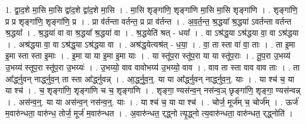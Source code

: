 \documentclass[17pt]{extarticle}
\begin{document}
1. द्वा॒द॒शे मा॒सि मा॒सि द्वा॑द॒शे द्वा॑द॒शे मा॒सि । . मा॒सि शृङ्गा॑णि॒ शृङ्गा॑णि मा॒सि मा॒सि शृङ्गा॑णि । . शृङ्गा॑णि॒ प्र प्र शृङ्गा॑णि॒ शृङ्गा॑णि॒ प्र । . प्रा व॑र्तन्ता वर्तन्त॒ प्र प्रा व॑र्तन्त । . अ॒व॒र्त॒न्त॒ श्र॒द्धया᳚ श्र॒द्धया॑ ऽवर्तन्ता वर्तन्त श्र॒द्धया᳚ । . श्र॒द्धया॑ वा वा श्र॒द्धया᳚ श्र॒द्धया॑ वा । . श्र॒द्धयेति॑ श्रत् - धया᳚ । . वा ऽश्र॑द्ध॒या ऽश्र॑द्धया वा॒ वा ऽश्र॑द्धया । . अश्र॑द्धया वा॒ वा ऽश्र॑द्ध॒या ऽश्र॑द्धया वा । . अश्र॑द्ध॒येत्यश्र॑त् - ध॒या॒ । . वा॒ ता स्ता वा॑ वा॒ ताः । . ता इ॒मा इ॒मा स्ता स्ता इ॒माः । . इ॒मा या या इ॒मा इ॒मा याः । . या स्तू॑प॒रा स्तू॑प॒रा या या स्तू॑प॒राः । . तू॒प॒रा उ॒भय्य॑ उ॒भय्य॑ स्तूप॒रा स्तू॑प॒रा उ॒भय्यः॑ । . उ॒भय्यो॒ वाव वावोभय्य॑ उ॒भय्यो॒ वाव । . वाव ता स्ता वाव वाव ताः । . ता आ᳚र्द्ध्नुवन् नार्द्ध्नुव॒न् ता स्ता आ᳚र्द्ध्नुवन्न् । . आ॒र्द्ध्नु॒व॒न्॒. या या आ᳚र्द्ध्नुवन् नार्द्ध्नुव॒न्॒. याः । . या श्च॑ च॒ या या श्च॑ । . च॒ शृङ्गा॑णि॒ शृङ्गा॑णि च च॒ शृङ्गा॑णि । . शृङ्गा॒ ण्यस॑न्व॒न् नस॑न्व॒ञ् छृङ्गा॑णि॒ शृङ्गा॒ ण्यस॑न्वन्न् । . अस॑न्व॒न्॒. या या अस॑न्व॒न् नस॑न्व॒न्॒. याः । . या श्च॑ च॒ या या श्च॑ । . चोर्ज॒ मूर्ज॑म् च॒ चोर्ज᳚म् । . ऊर्ज॑ म॒वारु॑न्धता॒ वारु॑न्ध॒ तोर्ज॒ मूर्ज॑ म॒वारु॑न्धत । . अ॒वारु॑न्धत॒ र्‌द्ध्नो त्यृ॒द्ध्नो त्य॒वारु॑न्धता॒ वारु॑न्धत॒ र्‌द्ध्नोति॑ । \newline
\end{document}
